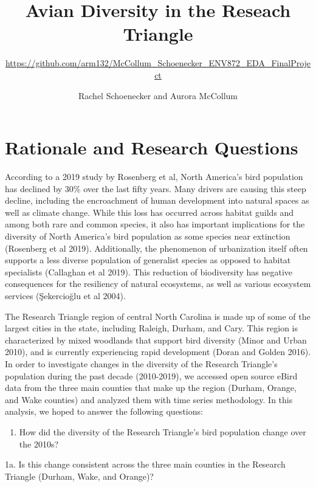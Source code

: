\documentclass[
  12pt,
]{article}
\title{Avian Diversity in the Reseach Triangle}
\subtitle{\url{https://github.com/arm132/McCollum_Schoenecker_ENV872_EDA_FinalProject}}
\author{Rachel Schoenecker and Aurora McCollum}
\date{}
\providecommand{\tightlist}{%
  \setlength{\itemsep}{0pt}\setlength{\parskip}{0pt}}
\begin{document}
\maketitle

\newpage
\tableofcontents 
\newpage
\listoftables 
\listoffigures 
\newpage

\hypertarget{rationale-and-research-questions}{%
\section{Rationale and Research
Questions}\label{rationale-and-research-questions}}

According to a 2019 study by Rosenberg et al, North America's bird
population has declined by 30\% over the last fifty years. Many drivers
are causing this steep decline, including the encroachment of human
development into natural spaces as well as climate change. While this
loss has occurred across habitat guilds and among both rare and common
species, it also has important implications for the diversity of North
America's bird population as some species near extinction (Rosenberg et
al 2019). Additionally, the phenomenon of urbanization itself often
supports a less diverse population of generalist species as opposed to
habitat specialists (Callaghan et al 2019). This reduction of
biodiversity has negative consequences for the resiliency of natural
ecosystems, as well as various ecosystem services (Şekercioğlu et al
2004).

The Research Triangle region of central North Carolina is made up of
some of the largest cities in the state, including Raleigh, Durham, and
Cary. This region is characterized by mixed woodlands that support bird
diversity (Minor and Urban 2010), and is currently experiencing rapid
development (Doran and Golden 2016). In order to investigate changes in
the diversity of the Research Triangle's population during the past
decade (2010-2019), we accessed open source eBird data from the three
main counties that make up the region (Durham, Orange, and Wake
counties) and analyzed them with time series methodology. In this
analysis, we hoped to answer the following questions:

\begin{enumerate}
\def\labelenumi{\arabic{enumi}.}
\tightlist
\item
  How did the diversity of the Research Triangle's bird population
  change over the 2010s?
\end{enumerate}

1a. Is this change consistent across the three main counties in the
Research Triangle (Durham, Wake, and Orange)?
\end{document}
